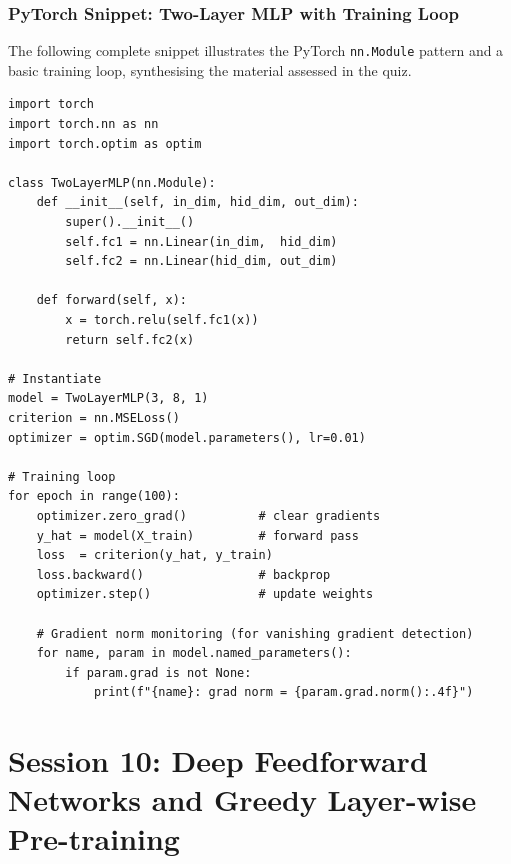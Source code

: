 \documentclass[12pt,a4paper]{article}
\begin{document}
\section{PyTorch Snippet: Two-Layer MLP with Training Loop}
\label{app:pytorch}

The following complete snippet illustrates the PyTorch \texttt{nn.Module}
pattern and a basic training loop, synthesising the material assessed
in the quiz.

\begin{verbatim}
import torch
import torch.nn as nn
import torch.optim as optim

class TwoLayerMLP(nn.Module):
    def __init__(self, in_dim, hid_dim, out_dim):
        super().__init__()
        self.fc1 = nn.Linear(in_dim,  hid_dim)
        self.fc2 = nn.Linear(hid_dim, out_dim)

    def forward(self, x):
        x = torch.relu(self.fc1(x))
        return self.fc2(x)

# Instantiate
model = TwoLayerMLP(3, 8, 1)
criterion = nn.MSELoss()
optimizer = optim.SGD(model.parameters(), lr=0.01)

# Training loop
for epoch in range(100):
    optimizer.zero_grad()          # clear gradients
    y_hat = model(X_train)         # forward pass
    loss  = criterion(y_hat, y_train)
    loss.backward()                # backprop
    optimizer.step()               # update weights

    # Gradient norm monitoring (for vanishing gradient detection)
    for name, param in model.named_parameters():
        if param.grad is not None:
            print(f"{name}: grad norm = {param.grad.norm():.4f}")
\end{verbatim}

\clearpage

\part{Session 10: Deep Feedforward Networks and Greedy Layer-wise Pre-training}
\end{document}
